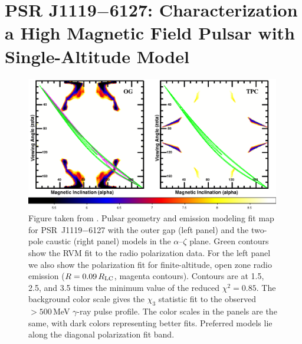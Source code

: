 
\section{PSR J1119$-$6127: Characterization a High Magnetic Field Pulsar with Single-Altitude Model}


\begin{figure}[t!!]
\includegraphics[width=0.99\textwidth]{chapters/multiWaveLength/figures/HBP_fig3_rev.eps}
\caption[Pulsar geometry and emission modeling fit map for PSR~J1119$-$6127 with the outer gap
(left panel) and the two-pole caustic (right panel) models in the $\alpha$--$\zeta$ plane]{
Figure taken from \cite{parent2011observations}.
Pulsar geometry and emission modeling fit map for PSR~J1119$-$6127 with the outer gap
(left panel) and the two-pole caustic (right panel) models in the $\alpha$--$\zeta$ plane. Green contours show
the RVM fit to the \cite{weltevrede2011glitch} radio polarization data. For
the left panel we also show the polarization fit for finite-altitude, open zone
radio emission ($R=0.09\,R_{\rm{LC}}$, magenta contours). Contours are at
1.5, 2.5, and 3.5 times the minimum value of the reduced
$\chi^2 = 0.85$. The background color scale gives the $\chi_3$ statistic fit to
the observed $> 500$\,MeV $\gamma$-ray pulse profile. The color scales in the panels are the
same, with dark colors representing better fits. Preferred models lie along the
diagonal polarization fit band. \label{fig:roger_goodness}}
\end{figure}

